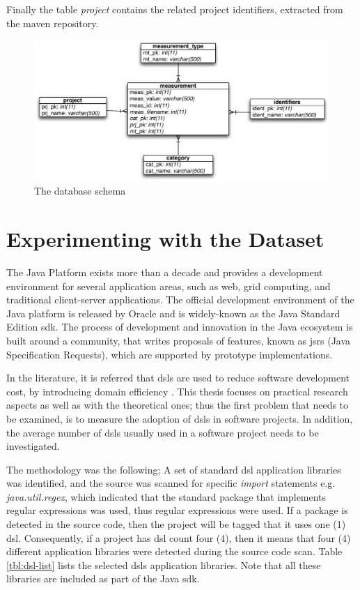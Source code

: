 \documentclass{sig-alternate}
\begin{document}
Finally the table \textit{project} contains the related project identifiers, extracted from the maven repository.

\begin{figure}
\centering
\includegraphics[scale=0.7]{database-schema}
\caption{The database schema}
\label{fig:database-schema}
\end{figure}

\section{Experimenting with the Dataset}
\label{sec:dsl}

The Java Platform exists more than a decade and provides a development environment for several application areas, such as web, grid computing, and traditional client-server applications. The official development environment of the Java platform is released by Oracle and is widely-known as the Java Standard Edition {\sc sdk}. The process of development and innovation in the Java ecosystem is built around a community, that writes proposals of features, known as {\sc jsr}s (Java Specification Requests), which are supported by prototype implementations.

In the literature, it is referred that {\sc dsl}s are used to reduce software development cost, by introducing domain efficiency \cite{MHS05}. This thesis focuses on practical research aspects as well as with the theoretical ones; thus the first problem that needs to be examined, is to measure the adoption of {\sc dsl}s in software projects. In addition, the average number of {\sc dsl}s usually used in a software project needs to be investigated.

The methodology was the following; A set of standard {\sc dsl} application libraries was identified, and the source was scanned for specific \textit{import} statements e.g. \textit{java.util.regex}, which indicated that the standard package that implements regular expressions was used, thus regular expressions were used. If a package is detected in the source code, then the project will be tagged that it uses one (1) {\sc dsl}. Consequently, if a project has {\sc dsl} count four (4), then it means that four (4) different application libraries were detected during the source code scan. Table \ref{tbl:dsl-list} lists the selected {\sc dsl}s application libraries. Note that all these libraries are included as part of the Java {\sc sdk}.
\end{document}
